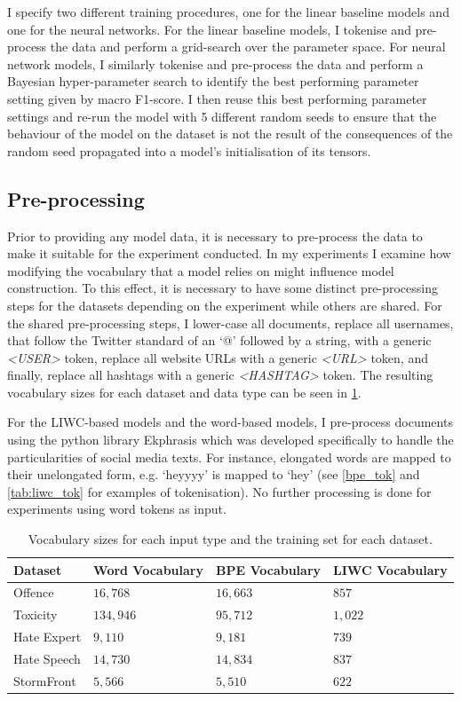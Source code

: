I specify two different training procedures, one for the linear baseline models and one for the neural networks.
For the linear baseline models, I tokenise and pre-process the data and perform a grid-search over the parameter space.
For neural network models, I similarly tokenise and pre-process the data and perform a Bayesian hyper-parameter search to identify the best performing parameter setting given by macro F1-score. I then reuse this best performing parameter settings and re-run the model with 5 different random seeds to ensure that the behaviour of the model on the dataset is not the result of the consequences of the random seed propagated into a model's initialisation of its tensors.

\subsection{Pre-processing}

Prior to providing any model data, it is necessary to pre-process the data to make it suitable for the experiment conducted. In my experiments I examine how modifying the vocabulary that a model relies on might influence model construction. To this effect, it is necessary to have some distinct pre-processing steps for the datasets depending on the experiment while others are shared. For the shared pre-processing steps, I lower-case all documents, replace all usernames, that follow the Twitter standard of an `@' followed by a string, with a generic \textit{<USER>} token, replace all website URLs with a generic \textit{<URL>} token, and finally, replace all hashtags with a generic \textit{<HASHTAG>} token. The resulting vocabulary sizes for each dataset and data type can be seen in \cref{tab:vocab_sizes}.

For the LIWC-based models and the word-based models, I pre-process documents using the python library Ekphrasis \citep{baziotis:2017} which was developed specifically to handle the particularities of social media texts. For instance, elongated words are mapped to their unelongated form, e.g. `heyyyy' is mapped to `hey' (see \cref{bpe_tok} and \cref{tab:liwc_tok} for examples of tokenisation). No further processing is done for experiments using word tokens as input.

\begin{table}[]
\centering
\begin{tabular}{llll}
Dataset     & Word Vocabulary & BPE Vocabulary & LIWC Vocabulary \\\hline
Offence     & $16,768$        & $16,663$       & $857$           \\
Toxicity    & $134,946$       & $95,712$       & $1,022$         \\
Hate Expert & $9,110$         & $9,181$        & $739$           \\
Hate Speech & $14,730$        & $14,834$       & $837$           \\
StormFront  & $5,566$         & $5,510$        & $622$
\end{tabular}
\caption{Vocabulary sizes for each input type and the training set for each dataset.}
\label{tab:vocab_sizes}
\end{table}

